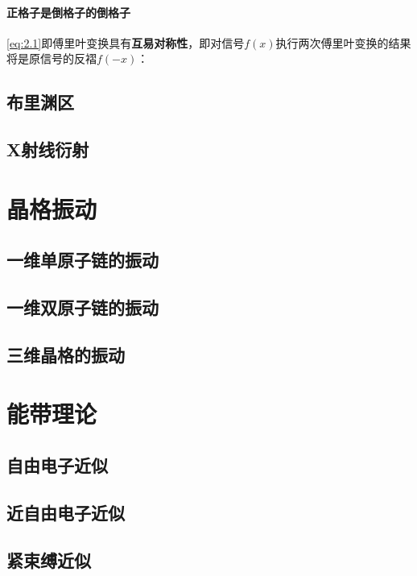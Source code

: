 \subsubsection{正格子是倒格子的倒格子}
    \autoref{eq:2.1}即傅里叶变换具有\textbf{互易对称性}，即对信号$f(x)$执行两次傅里叶变换的结果将是原信号的反褶$f(-x)$：
    


\section{布里渊区}
\section{X射线衍射}\label{sec:2-3}

\chapter{晶格振动}\label{chap:3}
\section{一维单原子链的振动}
\section{一维双原子链的振动}
\section{三维晶格的振动}

\chapter{能带理论}\label{chap:4}
\section{自由电子近似}
\section{近自由电子近似}
\section{紧束缚近似}